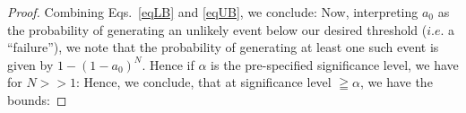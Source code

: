 \documentclass[onecolumn,10pt]{IEEEtran}
\begin{document}
\begin{proof}
  Combining Eqs.~\ref{eqLB} and \ref{eqUB}, we conclude:
  Now, interpreting $a_0$ as the probability of generating an unlikely event below our desired threshold ($i.e.$ a ``failure''), we note that the probability of generating at least one such event is given by $1-(1-a_0)^N$. Hence if $\alpha$ is the pre-specified significance level, we have for $N >> 1 $:
  Hence, we conclude, that at significance level $\geqq \alpha$, we have the bounds:
\end{proof}




 
\end{document}
